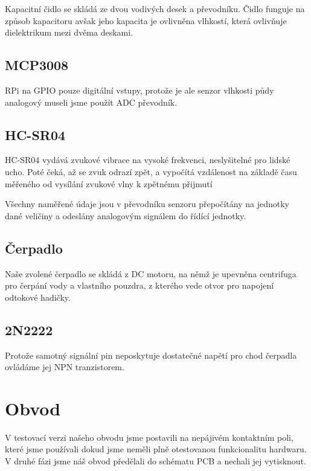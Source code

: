 \documentclass[11pt,a4paper]{article}
\begin{document}
Kapacitní čidlo se skládá ze dvou vodivých desek a převodníku. Čidlo funguje na způsob kapacitoru avšak jeho kapacita je ovlivněna vlhkostí, která ovlivňuje dielektrikum mezi dvěma deskami.

\subsection*{MCP3008}

RPi na GPIO pouze digitální vstupy, protože je ale senzor vlhkosti půdy analogový museli jsme použít ADC převodník.

\subsection*{HC-SR04}

HC-SR04 vydává zvukové vibrace na vysoké frekvenci, neslyšitelné pro lidské ucho. Poté čeká, až se zvuk odrazí zpět, a vypočítá vzdálenost na základě času měřeného od vysílání zvukové vlny k zpětnému přijmutí

Všechny naměřené údaje jsou v převodníku senzoru přepočítány na jednotky dané veličiny a odeslány analogovým signálem do řídící jednotky.

\subsection*{Čerpadlo}

Naše zvolené čerpadlo se skládá z DC motoru, na němž je upevněna centrifuga pro čerpání vody a vlastního pouzdra, z kterého vede otvor pro napojení odtokové hadičky.

\subsection*{2N2222}

Protože samotný signální pin neposkytuje dostatečné napětí pro chod čerpadla ovládáme jej NPN tranzistorem.

\section*{Obvod}

V testovací verzi našeho obvodu jsme postavili na nepájivém kontaktním poli, které jsme používali dokud jsme neměli plně otestovanou funkcionalitu hardwaru. V druhé fázi jsme náš obvod předělali do schématu PCB a nechali jej vytisknout.
\end{document}
